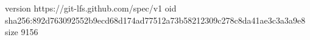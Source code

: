 version https://git-lfs.github.com/spec/v1
oid sha256:892d763092552b9ecd68d174ad77512a73b58212309c278c8da41ae3c3a3a9e8
size 9156
